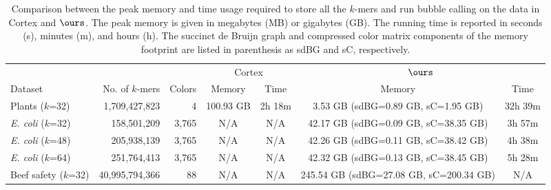 \begin{table}%
  \caption{Comparison between the peak memory and time usage required to store all the $k$-mers and run bubble calling on the data in {\sc Cortex} and $\ours$.
    The peak memory is given in megabytes (MB) or gigabytes (GB). The running time is reported in seconds (s), minutes (m), and hours (h).  The succinct de Bruijn graph and compressed color matrix components of the memory footprint are listed in parenthesis as sdBG and sC, respectively.}
 \label{tbl-cosmo}
 \scriptsize
 \setlength\tabcolsep{3pt}
  \centering
  \begin{tabular}{@{}lrrcccc@{}}
   	\toprule
	\multicolumn{1}{l}{}
   	& \multicolumn{1}{r}{}	
	& \multicolumn{1}{r}{} 
	& \multicolumn{2}{c}{{\sc Cortex}} 
	& \multicolumn{2}{c}{$\ours$}  \\
	\cmidrule(lr){4-5}\cmidrule(l){6-7}
	 Dataset & No. of $k$-mers & Colors & Memory & Time & Memory & Time \\
	\midrule
	Plants	($k$=32)				& 1,709,427,823 	& 4 	& 100.93 GB 	& 2h 18m	& 3.53 GB (sdBG=0.89 GB, sC=1.95 GB) 	& 32h 39m \\
     \emph{E. coli}  ($k$=32)         & 158,501,209       & 3,765 & N/A        & N/A      &  42.17 GB (sdBG=0.09 GB, sC=38.35 GB)     & 3h 57m  \\
     \emph{E. coli}  ($k$=48)         & 205,938,139       & 3,765 & N/A        & N/A      &  42.26 GB (sdBG=0.11 GB, sC=38.42 GB)     & 4h 38m  \\
     \emph{E. coli}  ($k$=64)         & 251,764,413       & 3,765 & N/A        & N/A      &  42.32 GB (sdBG=0.13 GB, sC=38.45 GB)     & 5h 28m  \\
    Beef safety ($k$=32)                            & 40,995,794,366    & 88    & N/A        & N/A   & 245.54 GB (sdBG=27.08 GB, sC=200.34 GB)     & N/A \\
 	\bottomrule
	\end{tabular}
\end{table}


\subsection{}

